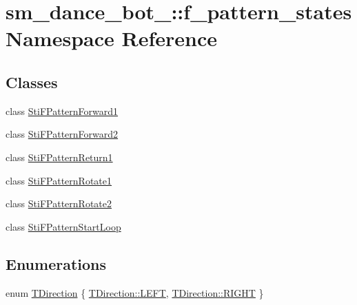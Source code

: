 \hypertarget{namespacesm__dance__bot__3_1_1f__pattern__states}{}\section{sm\+\_\+dance\+\_\+bot\+\_\+:\+:f\+\_\+pattern\+\_\+states Namespace Reference}
\label{namespacesm__dance__bot__3_1_1f__pattern__states}
\subsection*{Classes}
\begin{DoxyCompactItemize}
\item 
class \hyperlink{structsm__dance__bot__3_1_1f__pattern__states_1_1StiFPatternForward1}{Sti\+F\+Pattern\+Forward1}
\item 
class \hyperlink{structsm__dance__bot__3_1_1f__pattern__states_1_1StiFPatternForward2}{Sti\+F\+Pattern\+Forward2}
\item 
class \hyperlink{structsm__dance__bot__3_1_1f__pattern__states_1_1StiFPatternReturn1}{Sti\+F\+Pattern\+Return1}
\item 
class \hyperlink{structsm__dance__bot__3_1_1f__pattern__states_1_1StiFPatternRotate1}{Sti\+F\+Pattern\+Rotate1}
\item 
class \hyperlink{structsm__dance__bot__3_1_1f__pattern__states_1_1StiFPatternRotate2}{Sti\+F\+Pattern\+Rotate2}
\item 
class \hyperlink{structsm__dance__bot__3_1_1f__pattern__states_1_1StiFPatternStartLoop}{Sti\+F\+Pattern\+Start\+Loop}
\end{DoxyCompactItemize}
\subsection*{Enumerations}
\begin{DoxyCompactItemize}
\item 
enum \hyperlink{namespacesm__dance__bot__3_1_1f__pattern__states_a83147bb244b48451a16ce27e543c8157}{T\+Direction} \{ \hyperlink{namespacesm__dance__bot__3_1_1f__pattern__states_a83147bb244b48451a16ce27e543c8157a684d325a7303f52e64011467ff5c5758}{T\+Direction\+::\+L\+E\+FT}, 
\hyperlink{namespacesm__dance__bot__3_1_1f__pattern__states_a83147bb244b48451a16ce27e543c8157a21507b40c80068eda19865706fdc2403}{T\+Direction\+::\+R\+I\+G\+HT}
 \}
\end{DoxyCompactItemize}


